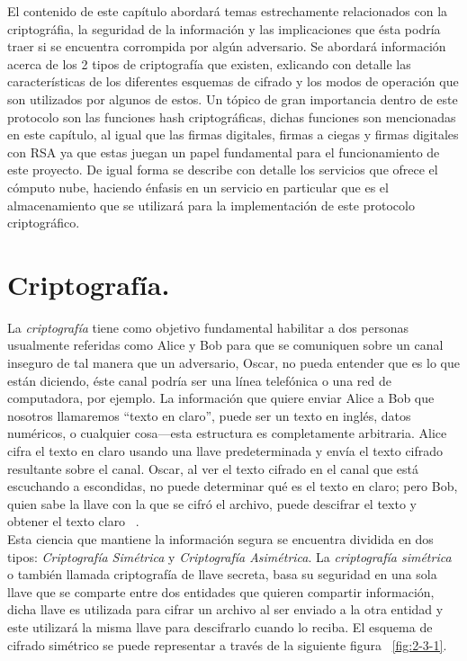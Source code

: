 
El contenido de este capítulo abordará temas estrechamente relacionados con la criptográfia, la seguridad de la información y las implicaciones que ésta podría traer si se encuentra corrompida por algún adversario. Se abordará información acerca de los 2 tipos de criptografía que existen, exlicando con detalle las características de los diferentes esquemas de cifrado y los modos de operación que son utilizados por algunos de estos. Un tópico de gran importancia dentro de este protocolo son las funciones hash criptográficas, dichas funciones son mencionadas en este capítulo, al igual que las firmas digitales, firmas a ciegas y firmas digitales con RSA ya que estas juegan un papel fundamental para el funcionamiento de este proyecto.  De igual forma se describe con detalle los servicios que ofrece el cómputo nube, haciendo énfasis en un servicio en particular que es el almacenamiento que se utilizará para la implementación de este protocolo criptográfico. 





\section{Criptografía. }

La \textit{ criptografía } tiene como objetivo fundamental habilitar a dos personas usualmente referidas como Alice y Bob para que se comuniquen sobre un canal inseguro de tal manera que un adversario, Oscar, no pueda entender que es lo que están diciendo, éste canal podría ser una línea telefónica o una red de computadora, por ejemplo. La información que quiere enviar Alice a Bob que nosotros llamaremos “texto en claro”, puede ser un texto en inglés, datos numéricos, o cualquier cosa---esta estructura es completamente arbitraria. Alice cifra el texto en claro usando una llave predeterminada y envía el texto cifrado resultante sobre el canal. Oscar, al ver el texto cifrado en el canal que está escuchando a escondidas, no puede determinar qué es el texto en claro; pero Bob, quien sabe la llave con la que se cifró el archivo, puede descifrar el texto y obtener el texto claro ~\cite{stinson}.\\

Esta ciencia que mantiene la información segura se encuentra dividida en dos tipos: \textit{Criptografía Simétrica} y \textit{Criptografía Asimétrica}. La \textit{ criptografía simétrica} o también llamada criptografía de llave secreta, basa su seguridad en una sola llave que se comparte entre dos entidades que quieren compartir información, dicha llave es utilizada para cifrar un archivo al ser enviado a la otra entidad y este utilizará la misma llave para descifrarlo cuando lo reciba. El esquema de cifrado simétrico se puede representar a través de la siguiente figura ~\ref{fig:2-3-1}. \\

